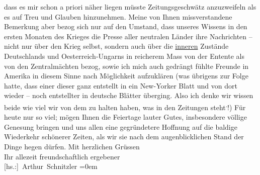 \begin{ledgroupsized}[t]{13cm}
               dass es mir schon a priori näher liegen müsste  Zeitungsgeschwätz anzuzweifeln als es auf Treu und Glauben
               hinzunehmen. Meine von Ihnen missverstandene Bemerkung aber bezog sich nur auf den
               Umstand, dass unseres Wissens in den {\pb}ersten
               Monaten des Krieges die Presse aller neutralen Länder ihre Nachrichten – nicht nur
               über den Krieg selbst, sondern auch über die \uline{inneren}
               Zustände Deutschlands und Oesterreich-Ungarns in reicherem Mass von der Entente als von
               den Zentralmächten bezog, sowie ich mich auch gedrängt fühlte Freunde in Amerika in diesem Sinne nach Möglichkeit aufzuklären (was übrigens zur Folge
               hatte, dass einer dieser \label{K_L02224-4v}\label{K_L02224-4h} ganz entstellt in ein New-Yorker Blatt und von dort
               wieder \introOben{}–\introOben{} noch entstellter in deutsche Blätter überging.
               Also ich denke wir wissen beide wie viel wir von dem zu halten haben, was in den
               Zeitungen steht\substVorne{}\textsuperscript{.}\substDazwischen{}!\substHinten{}\introOben{})\introOben{}\pend
           \pstart
           Für heute nur so viel; mögen Ihnen die Feiertage lauter Gutes, insbesondere völlige
               Genesung bringen und uns allen eine gegründetere Hoffnung auf die baldige Wiederkehr
               schönerer Zeiten, als wir sie nach dem augenblicklichen Stand der Dinge hegen
               dürfen.\pend
           \pstart
           Mit herzlichen Grüssen{\\[\baselineskip]}Ihr allezeit freundschaftlich ergebener{\\[\baselineskip]}\spacefill\mbox{{[}hs.:{]} Arthur Schnitzler}\pend
           \leftskip=0em{}
         
         \endnumbering{}\end{ledgroupsized}  \newcommand{\dateiname}{L02224}\newcommand{\titel}{Arthur Schnitzler an Georg Brandes, 22. 12. 1915}\newcommand{\editorInnen}{Martin Anton Müller und Gerd-Hermann Susen}
      